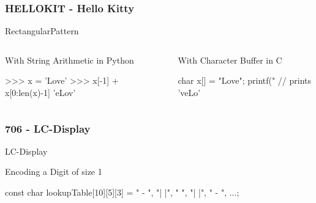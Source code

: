 \documentclass{beamer}
\begin{document}
\begin{frame}[fragile]
  \frametitle{HELLOKIT - Hello Kitty}

  \begin{algorithm}[H]
    \caption{RectangularPattern}
  \end{algorithm}

  \begin{columns}[t]
    \begin{column}{0.49\textwidth}
      \begin{block}{With String Arithmetic in Python}
        \begin{Python}
>>> x = 'Love'
>>> x[-1] + x[0:len(x)-1]
'eLov'
\end{Python}
\end{block}
    \end{column}

    \begin{column}{0.49\textwidth}
      \begin{block}{With Character Buffer in C}
        \begin{C}
char x[] = "Love";
printf("%
// prints 'veLo'
        \end{C}
      \end{block}
    \end{column}
  \end{columns}
\end{frame}


\begin{frame}[fragile]
  \frametitle{706 - LC-Display}

    \begin{algorithm}[H]
      \caption{LC-Display}
  \end{algorithm}

  \begin{block}{Encoding a Digit of size 1 }
    \begin{C}
const char lookupTable[10][5][3] = {
  { " - ",
    "| |",
    "   ",
    "| |",
    " - "},
    ...};
\end{C}
  \end{block}
\end{frame}
\end{document}
